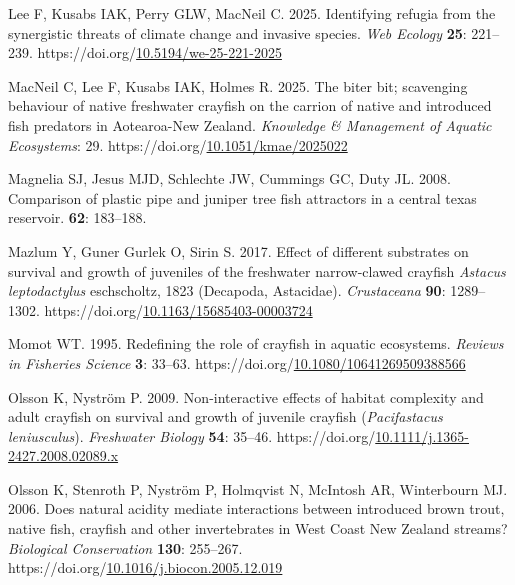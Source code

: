 \documentclass[
  letterpaper,
  DIV=11,
  numbers=noendperiod]{scrartcl}
\newlength{\cslhangindent}
\newenvironment{CSLReferences}[2] %
 {\begin{list}{}{%
  \setlength{\itemindent}{0pt}
  \setlength{\leftmargin}{0pt}
  \setlength{\parsep}{0pt}
  \ifodd #1
   \setlength{\leftmargin}{\cslhangindent}
   \setlength{\itemindent}{-1\cslhangindent}
  \fi
  \setlength{\itemsep}{#2\baselineskip}}}
 {\end{list}}
\begin{document}
\begin{CSLReferences}{1}{0}
Lee F, Kusabs IAK, Perry GLW, MacNeil C. 2025. Identifying refugia from
the synergistic threats of climate change and invasive species.
\emph{Web Ecology} \textbf{25}: 221--239.
https://doi.org/\href{https://doi.org/10.5194/we-25-221-2025}{10.5194/we-25-221-2025}

MacNeil C, Lee F, Kusabs IAK, Holmes R. 2025. The biter bit; scavenging
behaviour of native freshwater crayfish on the carrion of native and
introduced fish predators in {Aotearoa-New Zealand}. \emph{Knowledge \&
Management of Aquatic Ecosystems}: 29.
https://doi.org/\href{https://doi.org/10.1051/kmae/2025022}{10.1051/kmae/2025022}

Magnelia SJ, Jesus MJD, Schlechte JW, Cummings GC, Duty JL. 2008.
Comparison of plastic pipe and juniper tree fish attractors in a central
texas reservoir. \textbf{62}: 183--188.

Mazlum Y, Guner Gurlek O, Sirin S. 2017. Effect of different substrates
on survival and growth of juveniles of the freshwater narrow-clawed
crayfish {\emph{Astacus leptodactylus}} eschscholtz, 1823 ({Decapoda,
Astacidae}). \emph{Crustaceana} \textbf{90}: 1289--1302.
https://doi.org/\href{https://doi.org/10.1163/15685403-00003724}{10.1163/15685403-00003724}

Momot WT. 1995. Redefining the role of crayfish in aquatic ecosystems.
\emph{Reviews in Fisheries Science} \textbf{3}: 33--63.
https://doi.org/\href{https://doi.org/10.1080/10641269509388566}{10.1080/10641269509388566}

Olsson K, Nyström P. 2009. Non-interactive effects of habitat complexity
and adult crayfish on survival and growth of juvenile crayfish
({\emph{Pacifastacus leniusculus}}). \emph{Freshwater Biology}
\textbf{54}: 35--46.
https://doi.org/\href{https://doi.org/10.1111/j.1365-2427.2008.02089.x}{10.1111/j.1365-2427.2008.02089.x}

Olsson K, Stenroth P, Nyström P, Holmqvist N, McIntosh AR, Winterbourn
MJ. 2006. Does natural acidity mediate interactions between introduced
brown trout, native fish, crayfish and other invertebrates in {West
Coast New Zealand} streams? \emph{Biological Conservation} \textbf{130}:
255--267.
https://doi.org/\href{https://doi.org/10.1016/j.biocon.2005.12.019}{10.1016/j.biocon.2005.12.019}


\end{CSLReferences}
\end{document}
